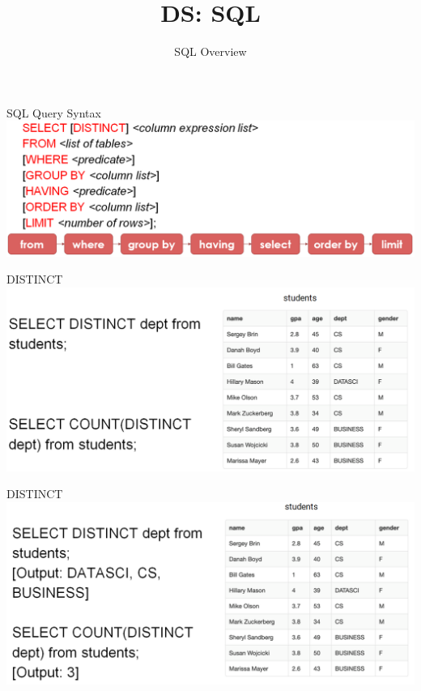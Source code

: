 \documentclass[aspectratio=169]{../latex_main/tntbeamer}  %
\title[Introduction]{DS: SQL}
\subtitle{SQL Overview}
\begin{document}
	
	\maketitle
	\begin{frame}[c]{SQL Query Syntax}
	    \includegraphics[scale=.4]{Bild6}
	\end{frame}
	
	
	\begin{frame}[c]{DISTINCT}
	    \includegraphics[scale=.4]{Bild7}
	\end{frame}
	
	
	
	\begin{frame}[c]{DISTINCT}
	    \includegraphics[scale=.4]{Bild8}
	\end{frame}
	
\end{document}
